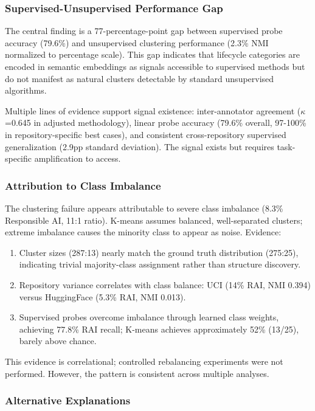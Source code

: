 
\subsubsection{Supervised-Unsupervised Performance Gap}

The central finding is a 77-percentage-point gap between supervised probe accuracy (79.6\%) and unsupervised clustering performance (2.3\% NMI normalized to percentage scale). This gap indicates that lifecycle categories are encoded in semantic embeddings as signals accessible to supervised methods but do not manifest as natural clusters detectable by standard unsupervised algorithms.

Multiple lines of evidence support signal existence: inter-annotator agreement ($\kappa$=0.645 in adjusted methodology), linear probe accuracy (79.6\% overall, 97-100\% in repository-specific best cases), and consistent cross-repository supervised generalization (2.9pp standard deviation). The signal exists but requires task-specific amplification to access.

\subsubsection{Attribution to Class Imbalance}

The clustering failure appears attributable to severe class imbalance (8.3\% Responsible AI, 11:1 ratio). K-means assumes balanced, well-separated clusters; extreme imbalance causes the minority class to appear as noise. Evidence:

\begin{enumerate}
\item Cluster sizes (287:13) nearly match the ground truth distribution (275:25), indicating trivial majority-class assignment rather than structure discovery.
\item Repository variance correlates with class balance: UCI (14\% RAI, NMI 0.394) versus HuggingFace (5.3\% RAI, NMI 0.013).
\item Supervised probes overcome imbalance through learned class weights, achieving 77.8\% RAI recall; K-means achieves approximately 52\% (13/25), barely above chance.
\end{enumerate}

This evidence is correlational; controlled rebalancing experiments were not performed. However, the pattern is consistent across multiple analyses.

\subsubsection{Alternative Explanations}


